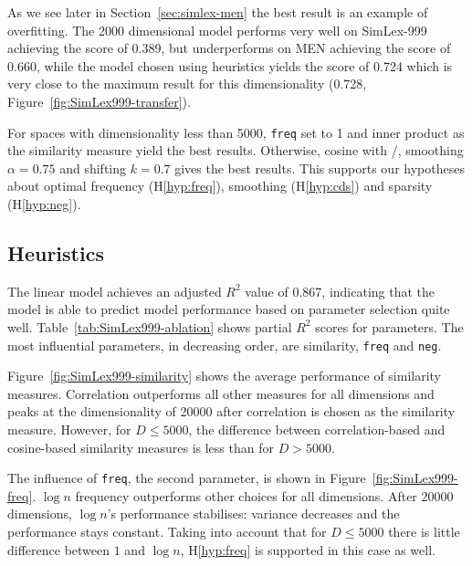 As we see later in Section~\ref{sec:simlex-men} the best result is an example of overfitting. The 2000 dimensional model performs very well on SimLex-999 achieving the score of 0.389, but underperforms on MEN achieving the score of 0.660, while the model chosen using heuristics yields the score of 0.724 which is very close to the maximum result for this dimensionality (0.728, Figure~\ref{fig:SimLex999-transfer}).

For spaces with dimensionality less than 5000, \texttt{freq} set to 1 and inner product as the similarity measure yield the best results. Otherwise, cosine with \logNSCPMI/, smoothing $\alpha=0.75$ and shifting $k=0.7$ gives the best results. This supports our hypotheses about optimal frequency (H\ref{hyp:freq}), smoothing (H\ref{hyp:cds}) and sparsity (H\ref{hyp:neg}).

\subsection{Heuristics}
\label{sec:heuristics-simlex}





% 

The linear model achieves an adjusted $R^2$ value of 0.867, indicating that the model is able to predict model performance based on parameter selection quite well. Table~\ref{tab:SimLex999-ablation} shows partial $R^2$ scores for parameters. The most influential parameters, in decreasing order, are similarity, \texttt{freq} and \texttt{neg}.


Figure~\ref{fig:SimLex999-similarity} shows the average performance of similarity measures. Correlation outperforms all other measures for all dimensions and peaks at the dimensionality  of 20000 after correlation is chosen as the similarity measure. However, for $D \leq 5000$, the difference between correlation-based and cosine-based similarity measures is less than for $D > 5000$.

The influence of \texttt{freq}, the second parameter, is shown in Figure~\ref{fig:SimLex999-freq}. $\log n$ frequency outperforms other choices for all dimensions. After 20000 dimensions, $\log n$'s performance stabilises: variance decreases and the performance stays constant. Taking into account that for $D \leq 5000$ there is little difference between $1$ and $\log n$, H\ref{hyp:freq} is supported in this case as well.
%
%

